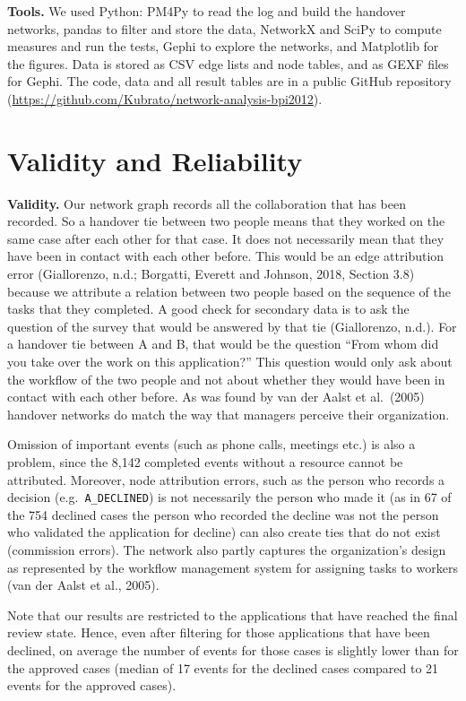 \documentclass[12pt, a4paper]{article}
\begin{document}
\textbf{Tools.} We used Python: PM4Py to read the log and build the handover networks, pandas to filter and store the data, NetworkX and SciPy to compute measures and run the tests, Gephi to explore the networks, and Matplotlib for the figures. Data is stored as CSV edge lists and node tables, and as GEXF files for Gephi. The code, data and all result tables are in a public GitHub repository (\url{https://github.com/Kubrato/network-analysis-bpi2012}).

\section{Validity and Reliability}
\label{validity-and-reliability}

\textbf{Validity.}
Our network graph records all the collaboration that has been recorded. So a handover tie between two people means that they worked on the same case after each other for that case. It does not necessarily mean that they have been in contact with each other before. This would be an edge attribution error (Giallorenzo, n.d.; Borgatti, Everett and Johnson, 2018, Section 3.8) because we attribute a relation between two people based on the sequence of the tasks that they completed. A good check for secondary data is to ask the question of the survey that would be answered by that tie (Giallorenzo, n.d.). For a handover tie between A and B, that would be the question ``From whom did you take over the work on this application?'' This question would only ask about the workflow of the two people and not about whether they would have been in contact with each other before. As was found by van der Aalst et al.\ (2005) handover networks do match the way that managers perceive their organization.

Omission of important events (such as phone calls, meetings etc.) is also a problem, since the 8,142 completed events without a resource cannot be attributed. Moreover, node attribution errors, such as the person who records a decision (e.g.\ \texttt{A\_DECLINED}) is not necessarily the person who made it (as in 67 of the 754 declined cases the person who recorded the decline was not the person who validated the application for decline) can also create ties that do not exist (commission errors). The network also partly captures the organization's design as represented by the workflow management system for assigning tasks to workers (van der Aalst et al., 2005).

Note that our results are restricted to the applications that have reached the final review state. Hence, even after filtering for those applications that have been declined, on average the number of events for those cases is slightly lower than for the approved cases (median of 17 events for the declined cases compared to 21 events for the approved cases).
\end{document}
